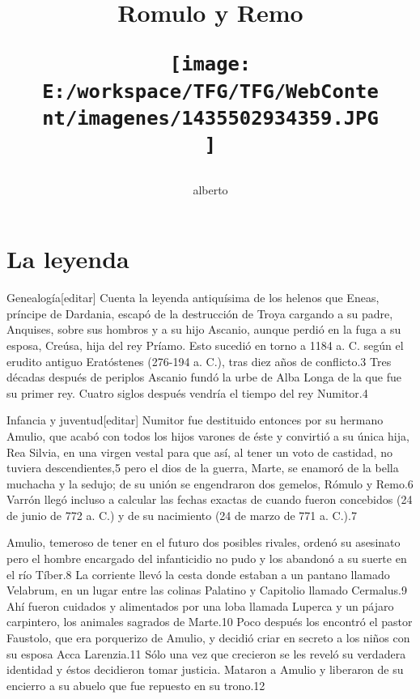 \documentclass[11pt,a4paper]{book}
\title{\Huge{\textbf{Romulo y Remo}}
\begin{figure}[hbtp]
		\centering
		\texttt{[image: E:/workspace/TFG/TFG/WebContent/imagenes/1435502934359.JPG]}
	\end{figure}}
\author{alberto}
\begin{document}
\maketitle

\tableofcontents


			\chapter{La leyenda}
												Genealogía[editar]
	\bigskip
							Cuenta la leyenda antiquísima de los helenos que Eneas, príncipe de Dardania, escapó de la destrucción de Troya cargando a su padre, Anquises, sobre sus hombros y a su hijo Ascanio, aunque perdió en la fuga a su esposa, Creúsa, hija del rey Príamo. Esto sucedió en torno a 1184 a. C. según el erudito antiguo Eratóstenes (276-194 a. C.), tras diez años de conflicto.3 Tres décadas después de periplos Ascanio fundó la urbe de Alba Longa de la que fue su primer rey. Cuatro siglos después vendría el tiempo del rey Numitor.4
	\bigskip
							
	\bigskip
							Infancia y juventud[editar]
	\bigskip
							Numitor fue destituido entonces por su hermano Amulio, que acabó con todos los hijos varones de éste y convirtió a su única hija, Rea Silvia, en una virgen vestal para que así, al tener un voto de castidad, no tuviera descendientes,5 pero el dios de la guerra, Marte, se enamoró de la bella muchacha y la sedujo; de su unión se engendraron dos gemelos, Rómulo y Remo.6 Varrón llegó incluso a calcular las fechas exactas de cuando fueron concebidos (24 de junio de 772 a. C.) y de su nacimiento (24 de marzo de 771 a. C.).7
	\bigskip
							
	\bigskip
							Amulio, temeroso de tener en el futuro dos posibles rivales, ordenó su asesinato pero el hombre encargado del infanticidio no pudo y los abandonó a su suerte en el río Tíber.8 La corriente llevó la cesta donde estaban a un pantano llamado Velabrum, en un lugar entre las colinas Palatino y Capitolio llamado Cermalus.9 Ahí fueron cuidados y alimentados por una loba llamada Luperca y un pájaro carpintero, los animales sagrados de Marte.10 Poco después los encontró el pastor Faustolo, que era porquerizo de Amulio, y decidió criar en secreto a los niños con su esposa Acca Larenzia.11 Sólo una vez que crecieron se les reveló su verdadera identidad y éstos decidieron tomar justicia. Mataron a Amulio y liberaron de su encierro a su abuelo que fue repuesto en su trono.12
	\bigskip
							
\end{document}
